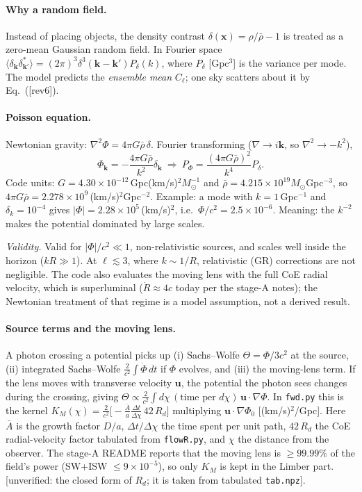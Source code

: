 \documentclass[11pt]{article}
\newcommand{\why}[1]{\par\noindent\textit{Validity.} #1\par}
\newcommand{\flag}[1]{\textsf{[unverified: #1]}}
\begin{document}
\paragraph{Why a random field.} Instead of placing objects, the density contrast $\delta(\mathbf x)=\rho/\bar\rho-1$ is treated as a zero-mean Gaussian random field. In Fourier space $\langle\delta_{\mathbf k}\delta^*_{\mathbf k'}\rangle=(2\pi)^3\delta^3(\mathbf k-\mathbf k')P_\delta(k)$, where $P_\delta$ [Gpc$^3$] is the variance per mode. The model predicts the \emph{ensemble mean} $C_\ell$; one sky scatters about it by Eq.~([rev6]).

\paragraph{Poisson equation.} Newtonian gravity: $\nabla^2\Phi=4\pi G\bar\rho\,\delta$. Fourier transforming ($\nabla\to i\mathbf k$, so $\nabla^2\to-k^2$),
\begin{equation}\label{r6:eq15}
\Phi_{\mathbf k}=-\frac{4\pi G\bar\rho}{k^2}\delta_{\mathbf k}\ \Rightarrow\ P_\Phi=\frac{(4\pi G\bar\rho)^2}{k^4}P_\delta .
\end{equation}
Code units: $G=4.30\times10^{-12}$\,Gpc(km/s)$^2M_\odot^{-1}$ and $\bar\rho=4.215\times10^{19}M_\odot$Gpc$^{-3}$, so $4\pi G\bar\rho=2.278\times10^9$\,(km/s)$^2$Gpc$^{-2}$. Example: a mode with $k=1$\,Gpc$^{-1}$ and $\delta_k=10^{-4}$ gives $|\Phi|=2.28\times10^5$\,(km/s)$^2$, i.e.\ $\Phi/c^2=2.5\times10^{-6}$. Meaning: the $k^{-2}$ makes the potential dominated by large scales.
\why{Valid for $|\Phi|/c^2\ll1$, non-relativistic sources, and scales well inside the horizon ($kR\gg1$). At $\ell\lesssim3$, where $k\sim1/R$, relativistic (GR) corrections are not negligible. The code also evaluates the moving lens with the full CoE radial velocity, which is superluminal ($\dot R\approx4c$ today per the stage-A notes); the Newtonian treatment of that regime is a model assumption, not a derived result.}

\paragraph{Source terms and the moving lens.} A photon crossing a potential picks up (i) Sachs--Wolfe $\Theta=\Phi/3c^2$ at the source, (ii) integrated Sachs--Wolfe $\frac{2}{c^2}\int\dot\Phi\,dt$ if $\Phi$ evolves, and (iii) the moving-lens term. If the lens moves with transverse velocity $\mathbf u$, the potential the photon sees changes during the crossing, giving $\Theta\propto\frac{2}{c^2}\int d\chi\,(\text{time per }d\chi)\,\mathbf u\cdot\nabla\Phi$. In \texttt{fwd.py} this is the kernel $K_M(\chi)=\frac{2}{c^2}\big[-\frac{\bar A}{a}\frac{\Delta t}{\Delta\chi}\,42\,R_d\big]$ multiplying $\mathbf u\cdot\nabla\Phi_0$ [(km/s)$^2$/Gpc]. Here $\bar A$ is the growth factor $D/a$, $\Delta t/\Delta\chi$ the time spent per unit path, $42\,R_d$ the CoE radial-velocity factor tabulated from \texttt{flowR.py}, and $\chi$ the distance from the observer. The stage-A README reports that the moving lens is $\ge99.99\%$ of the field's power (SW+ISW $\le9\times10^{-5}$), so only $K_M$ is kept in the Limber part. \flag{the closed form of $R_d$; it is taken from tabulated \texttt{tab.npz}}.
\end{document}

